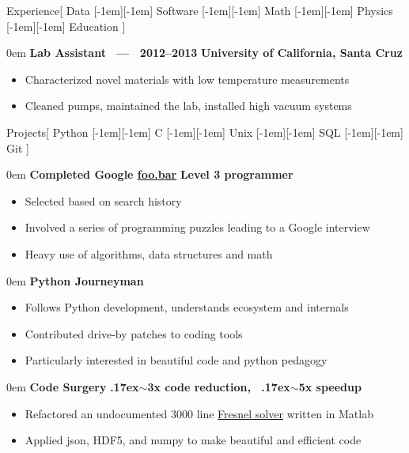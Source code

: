 \documentclass[11pt,a4paper]{article}
\newenvironment{headedsection}[2]{
    \begin{addmargin}[0.5em]{0em}
    {\large\bfseries #1} \hfill {\bfseries #2}%
    \begin{itemize}
        [label={}, topsep=0pt, itemsep=1.5pt, parsep=0pt, leftmargin=1.5em]
}{
    \end{itemize}
    \end{addmargin}
    \medskip
}
\newcommand*\sbull{%
    \raisebox{-0.550ex}[-1em][-1em]{\textscale{4}{\( \cdot \)}}\xspace
}
\newcommand{\mytilde}{\raise.17ex\hbox{$\scriptstyle\sim$}}
\begin{document}
\begin{mysection}{Experience}[
    Data \sbull{} Software \sbull{} Math \sbull{} Physics \sbull{} Education
]
    \begin{headedsection}
          {Lab Assistant \ --- \ 2012--2013}
          {University of California, Santa Cruz}

        \item Characterized novel materials with low temperature measurements
        \item Cleaned pumps, maintained the lab, installed high vacuum systems
    \end{headedsection}
\end{mysection}

\begin{mysection}{Projects}[
    Python \sbull{} C \sbull{} Unix \sbull{} SQL \sbull{} Git
]

    \begin{headedsection}
        {Completed Google 
            \href{https://news.ycombinator.com/item?id=8588080}{foo.bar}}
        {Level 3 programmer}

        \item Selected based on search history
        \item Involved a series of programming puzzles leading to a Google
            interview
        \item Heavy use of algorithms, data structures and math
    \end{headedsection}

    \begin{headedsection}{Python Journeyman}{}
        \item Follows Python development, understands ecosystem and internals
        \item Contributed drive-by patches to coding tools
        \item Particularly interested in beautiful code and python pedagogy
    \end{headedsection}

    \begin{headedsection}{Code Surgery}
          {\mytilde{}3x code reduction, \ \mytilde{}5x speedup}

        \item Refactored an undocumented 3000 line
            \href{https://en.wikipedia.org/wiki/Fresnel_equations}
                {Fresnel solver}
             written in Matlab
        \item Applied json, HDF5, and numpy to make beautiful and efficient 
            code
    \end{headedsection}
\end{mysection}
\end{document}
